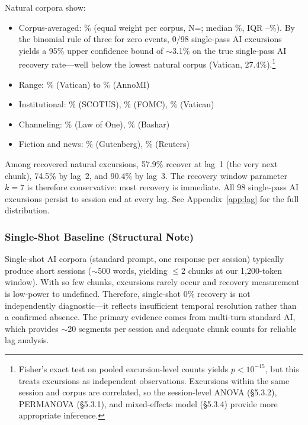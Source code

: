 \documentclass[final]{clv2025}
\begin{document}
Natural corpora show:
\begin{itemize}
\item Corpus-averaged: \recNatCorpusAvg\% (equal weight per corpus, N=\nNatural; median \recNatMedian\%, IQR \recNatIQRlo--\recNatIQRhi\%). By the binomial rule of three for zero events, 0/98 single-pass AI excursions yields a 95\% upper confidence bound of $\sim$3.1\% on the true single-pass AI recovery rate---well below the lowest natural corpus (Vatican, 27.4\%).\footnote{Fisher's exact test on pooled excursion-level counts yields $p < 10^{-15}$, but this treats excursions as independent observations. Excursions within the same session and corpus are correlated, so the session-level ANOVA (\S5.3.2), PERMANOVA (\S5.3.1), and mixed-effects model (\S5.3.4) provide more appropriate inference.}
\item Range: \recVatican\% (Vatican) to \recAnnoMI\% (AnnoMI)
\item Institutional: \recSCOTUS\% (SCOTUS), \recFOMC\% (FOMC), \recVatican\% (Vatican)
\item Channeling: \recLawOfOne\% (Law of One), \recBashar\% (Bashar)
\item Fiction and news: \recFiction\% (Gutenberg), \recNews\% (Reuters)
\end{itemize}

Among recovered natural excursions, 57.9\% recover at lag~1 (the very next chunk), 74.5\% by lag~2, and 90.4\% by lag~3. The recovery window parameter $k=7$ is therefore conservative: most recovery is immediate. All 98 single-pass AI excursions persist to session end at every lag. See Appendix~\ref{app:lag} for the full distribution.

\subsubsection{Single-Shot Baseline (Structural Note)}
\label{sec:singleshot}

Single-shot AI corpora (standard prompt, one response per session) typically produce short sessions ($\sim$500 words, yielding $\leq$2 chunks at our 1,200-token window). With so few chunks, excursions rarely occur and recovery measurement is low-power to undefined. Therefore, single-shot 0\% recovery is not independently diagnostic---it reflects insufficient temporal resolution rather than a confirmed absence. The primary evidence comes from multi-turn standard AI, which provides $\sim$20 segments per session and adequate chunk counts for reliable lag analysis.
\end{document}
